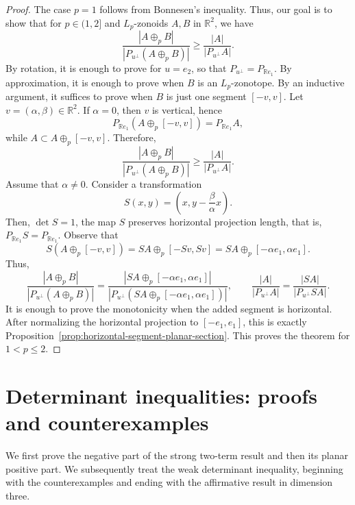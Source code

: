 \documentclass[11pt,a4paper]{amsart}
\theoremstyle{plain}
\theoremstyle{definition}
\newcommand{\R}{\mathbb R}
\begin{document}
\RatioLpZonoidweak*
\begin{proof}
The case $p=1$ follows from Bonnesen’s inequality. Thus, our goal is to show that for $p\in (1,2]$ and  $L_p$-zonoids $A, B$ in $\mathbb{R}^2$,  we have 
$$
\frac{\left|A \oplus_p B\right|}{\left|P_{u^{\perp}}\left(A \oplus_p B\right)\right|} 
\geq
\frac{|A|}{\left|P_{u^{\perp}} A\right|}.
$$
By rotation, it is enough to prove for $u=e_2$, so that $P_{u^\perp}=P_{\R e_1}$. By approximation, it is enough to prove when $B$ is an $L_p$-zonotope.
By an inductive argument,
it suffices to prove when $B$ is just one segment $[-v,v]$. Let $v=(\alpha,\beta)\in\R^2$. If $\alpha =0$, then $v$ is vertical, hence
\[
    P_{\R e_1}(A\oplus_p[-v,v])=P_{\R e_1}A,
\]
while $A\subset A\oplus_p[-v,v]$. Therefore,
\[
    \frac{\left|A \oplus_p B\right|}{\left|P_{u^{\perp}}\left(A \oplus_p B\right)\right|} 
\geq
\frac{|A|}{\left|P_{u^{\perp}} A\right|}.
\]
Assume that $\alpha\neq0$. Consider a transformation
\[
    S(x,y)=\left(x,y-\frac{\beta}{\alpha}x\right).
\]
Then,  $\det S=1$, the map $S$ preserves horizontal projection length, that is, $P_{\mathbb{R} e_1} S=P_{\mathbb{R} e_1}$.
Observe that
\[
    S(A\oplus_p[-v,v])=SA\oplus_p[-Sv,Sv] = SA \oplus_p [-\alpha e_1,\alpha e_1] 
    .
\]
Thus,
\[
    \frac{\left|A \oplus_p B\right|}{\left|P_{u^{\perp}}\left(A \oplus_p B\right)\right|}  = \frac{\left|SA \oplus_p [-\alpha e_1,\alpha e_1]\right|}{\left|P_{u^{\perp}}\left(SA \oplus_p [-\alpha e_1,\alpha e_1]\right)\right|}, \qquad \frac{|A|}{\left|P_{u^{\perp}} A\right|} =\frac{|SA|}{\left|P_{u^{\perp}} SA\right|}.
\]
It is enough to prove the monotonicity when the added segment is horizontal. After normalizing the horizontal projection to $[-e_1,e_1]$, this is exactly Proposition~\ref{prop:horizontal-segment-planar-section}. This proves the theorem for $1<p\leq2$.
\end{proof}

\section{Determinant inequalities: proofs and counterexamples}\label{sec:determinants}

We first prove the negative part of the strong two-term result and then its
planar positive part.  We subsequently treat the weak determinant  inequality, beginning
with the counterexamples and ending with the affirmative result in dimension
three.
\end{document}
